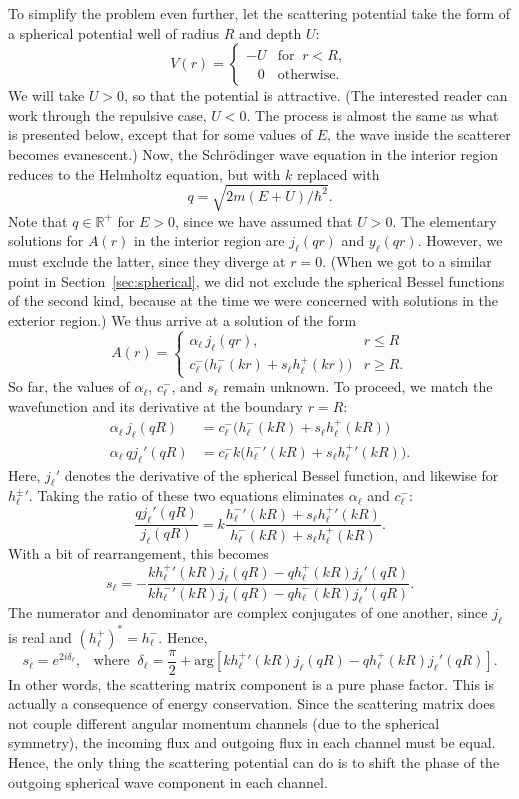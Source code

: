 \documentclass[pra,12pt]{revtex4}
\begin{document}
To simplify the problem even further, let the scattering potential
take the form of a spherical potential well of radius $R$ and depth
$U$:
$$V(r) = \begin{cases}-U &\mathrm{for}\;\; r < R, \\ \;\;\; 0 & \mathrm{otherwise}.\end{cases}$$
We will take $U > 0$, so that the potential is attractive.  (The
interested reader can work through the repulsive case, $U < 0$.  The
process is almost the same as what is presented below, except that for
some values of $E$, the wave inside the scatterer becomes evanescent.)
Now, the Schr\"odinger wave equation in the interior region reduces to
the Helmholtz equation, but with $k$ replaced with
$$q = \sqrt{2m(E+U)/\hbar^2}.$$
Note that $q \in \mathbb{R}^+$ for $E > 0$, since we have assumed
that $U > 0$.  The elementary solutions for $A(r)$ in the interior
region are $j_\ell(qr)$ and $y_\ell(qr)$.  However, we must exclude
the latter, since they diverge at $r = 0$.  (When we got to a similar
point in Section~\ref{sec:spherical}, we did not exclude the spherical
Bessel functions of the second kind, because at the time we were
concerned with solutions in the exterior region.)  We thus arrive at a
solution of the form
$$A(r) = \begin{cases} \alpha_\ell\, j_\ell(qr), & r \le R \\ c^-_\ell \Big(h^-_\ell(kr) + s_\ell h^+_\ell(kr)\Big) & r \ge R.\end{cases}$$
So far, the values of $\alpha_\ell$, $c^-_\ell$, and $s_\ell$ remain
unknown.  To proceed, we match the wavefunction and its
derivative at the boundary $r = R$:
$$\begin{aligned} \alpha_\ell\, j_\ell(qR) &= c^-_\ell \Big(h^-_\ell(kR) + s_\ell h^+_\ell(kR)\Big) \\ \alpha_\ell\, q j_\ell'(qR) &= c^-_\ell k \Big({h^-_\ell}'(kR) + s_\ell {h^+_\ell}'(kR)\Big).\end{aligned}$$
Here, $j_\ell'$ denotes the derivative of the spherical Bessel
function, and likewise for ${h_\ell^\pm}'$.  Taking the ratio of these
two equations eliminates $\alpha_\ell$ and $c_\ell^-$:
$$\frac{q j_\ell'(qR)}{j_\ell(qR)} = k \frac{{h^-_\ell}'(kR) + s_\ell {h^+_\ell}'(kR)}{h^-_\ell(kR) + s_\ell h^+_\ell(kR)}.$$
With a bit of rearrangement, this becomes
$$s_\ell = - \frac{k{h_\ell^+}'(kR) j_\ell(qR) - qh_\ell^+(kR)j_\ell'(qR)}{k{h_\ell^-}'(kR) j_\ell(qR) - qh_\ell^-(kR)j_\ell'(qR)}.$$
The numerator and denominator are complex conjugates of one another,
since $j_\ell$ is real and $(h_\ell^+)^* = h_\ell^-$.  Hence,
$$s_\ell = e^{2i\delta_\ell}, \;\;\;\mathrm{where}\;\; \delta_\ell = \frac{\pi}{2} + \mathrm{arg}\!\left[k{h_\ell^+}'(kR) j_\ell(qR) - qh_\ell^+(kR)j_\ell'(qR)\right].$$
In other words, the scattering matrix component is a pure phase
factor.  This is actually a consequence of energy conservation.  Since
the scattering matrix does not couple different angular momentum
channels (due to the spherical symmetry), the incoming flux and
outgoing flux in each channel must be equal.  Hence, the only thing
the scattering potential can do is to shift the phase of the outgoing
spherical wave component in each channel.
\end{document}
